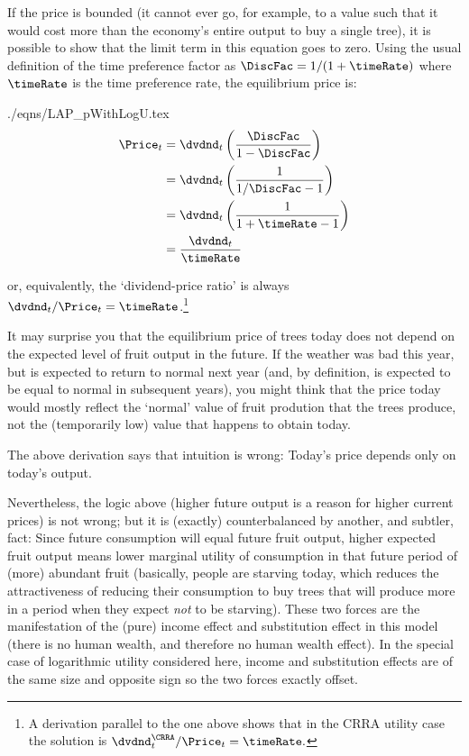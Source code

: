 \documentclass{handout}
\begin{document}
If the price is bounded (it cannot ever go, for 
example, to a value such that it would cost more than the economy's 
entire output to buy a single tree), it is possible to show that the limit term 
in this equation goes to zero.  Using the usual definition of the time preference factor
as $\DiscFac = 1/(1+\timeRate)$ where $\timeRate$ is the time preference rate, the equilibrium price is:
\begin{verbatimwrite}{./eqns/LAP_pWithLogU.tex}
\begin{equation}\begin{gathered}\begin{aligned}
 \Price_{t} & =  \dvdnd_{t}\left(\frac{\DiscFac}{1-\DiscFac} \right) \notag 
\\  & =  \dvdnd_{t}\left(\frac{1}{1/\DiscFac-1} \right) \notag 
\\  & =  \dvdnd_{t}\left(\frac{1}{1+\timeRate-1} \right) \notag
\\  & =  \frac{\dvdnd_{t}}{\timeRate} \label{eq:pWithLogU}
\end{aligned}\end{gathered}\end{equation}
\end{verbatimwrite}

or, equivalently, the `dividend-price ratio' is always $\dvdnd_{t}/\Price_{t} = \timeRate$.\footnote{A derivation parallel to the one above shows that in the CRRA utility case the solution is $\dvdnd_{t}^{\CRRA}/\Price_{t} = \timeRate.$}

It may surprise you that the equilibrium price of trees today does not depend on the expected level of fruit output in the future.  If the weather was bad this year, but is expected to return to normal next year (and, by definition, is expected to be equal to normal in subsequent years), you might think that the price today would mostly reflect the `normal' value of fruit prodution that the trees produce, not the (temporarily low) value that happens to obtain today.

The above derivation says that intuition is wrong: Today's price depends only on today's output.

Nevertheless, the logic above (higher future output is a reason for higher current prices) is not wrong; but it is (exactly) counterbalanced by another, and subtler, fact: Since future consumption will equal future fruit output, higher expected fruit output means lower marginal utility of consumption in that future period of (more) abundant fruit (basically, people are starving today, which reduces the attractiveness of reducing their consumption to buy trees that will produce more in a period when they expect \textit{not} to be starving).  These two forces are the manifestation of the (pure) income effect and substitution effect in this model (there is no human wealth, and therefore no human wealth effect).  In the special case of logarithmic utility considered here, income and substitution effects are of the same size and opposite sign so the two forces exactly offset.
\end{document}
